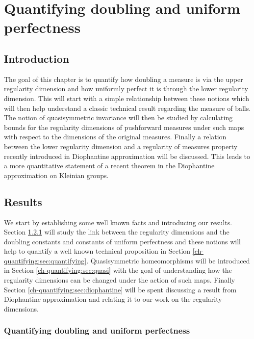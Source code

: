 \chapter{Quantifying doubling and uniform perfectness}
\label{chap:quantifying}


\section{Introduction}
\label{sec:intro-quantifying}


The goal of this chapter is to quantify how doubling a measure is via the upper regularity dimension and how uniformly perfect it is through the lower regularity dimension. This will start with a simple relationship between these notions which will then help understand a classic technical result regarding the measure of balls. The notion of quasisymmetric invariance will then be studied by calculating bounds for the regularity dimensions of pushforward measures under such maps with respect to the dimensions of the original measures. Finally a relation between the lower regularity dimension and a regularity of measures property recently introduced in Diophantine approximation will be discussed. This leads to a more quantitative statement of a recent theorem in the Diophantine approximation on Kleinian groups.





\section{Results}\label{ch-quantifying:sec:results}

We start by establishing some well known facts and introducing our results. Section \ref{ch-quantifying:sec:equivalence} will study the link between the regularity dimensions and the doubling constants and constants of uniform perfectness and these notions will help to quantify a well known technical proposition in Section \ref{ch-quantifying:sec:quantifying}. Quasisymmetric homeomorphisms will be introduced in Section \ref{ch-quantifying:sec:quasi} with the goal of understanding how the regularity dimensions can be changed under the action of such maps. Finally Section \ref{ch-quantifying:sec:diophantine} will be spent discussing a result from Diophantine approximation and relating it to our work on the regularity dimensions.


\subsection{Quantifying doubling and uniform perfectness}\label{ch-quantifying:sec:equivalence}

